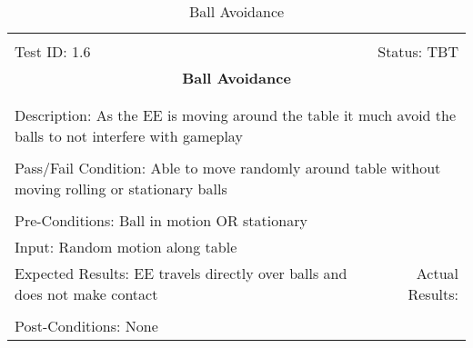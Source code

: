 \documentclass[titlepage]{article}
\begin{document}
\begin{center}%
\begin{table}
\begin{tabular}{|l r|}\hline&\\[-2mm]
	Test ID: 1.6	&Status: TBT\\[-3mm]
	\multicolumn{2}{|c|}{\textbf{\large{Ball Avoidance}}}\\&\\\hline&\\[-3mm]
	\multicolumn{2}{|p{\textwidth}|}{Description: As the EE is moving around the table it much avoid the balls to not interfere with gameplay}\\[1mm]\hline&\\[-3mm]
	\multicolumn{2}{|p{\textwidth}|}{Pass/Fail Condition: Able to move randomly around table without moving rolling or stationary balls}\\[1mm]\hline&\\[-3mm]
	\multicolumn{2}{|p{\textwidth}|}{Pre-Conditions: Ball in motion OR stationary}\\[4mm]
	\multicolumn{2}{|p{\textwidth}|}{Input: Random motion along table}\\[2mm]\hline
	\multicolumn{1}{|p{0.49\textwidth}}{Expected Results: EE travels directly over balls and does not make contact}	&\multicolumn{1}{|p{0.45\textwidth}|}{Actual Results:}\\\hline&\\[-3mm]
	\multicolumn{2}{|p{\textwidth}|}{Post-Conditions: None}\\\hline
\end{tabular}
\caption{Ball Avoidance}
\end{table}
\end{center}
\end{document}
